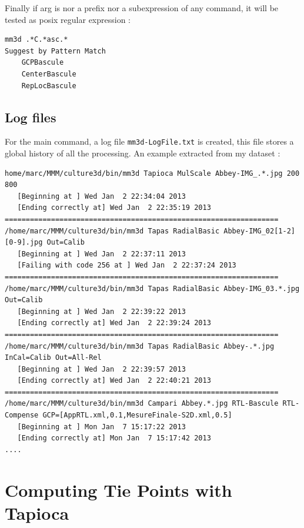 Finally if arg is nor a prefix nor a subexpression of any command, it will be tested as posix regular 
expression :

\begin{verbatim}
mm3d .*C.*asc.*
Suggest by Pattern Match
    GCPBascule
    CenterBascule
    RepLocBascule
\end{verbatim}

\subsection{Log files}

For the main command, a log file {\tt mm3d-LogFile.txt} is created, this file stores
a global history of all the processing. An example extracted from my dataset :

\begin{verbatim}
home/marc/MMM/culture3d/bin/mm3d Tapioca MulScale Abbey-IMG_.*.jpg 200 800
   [Beginning at ] Wed Jan  2 22:34:04 2013
   [Ending correctly at] Wed Jan  2 22:35:19 2013
=================================================================
/home/marc/MMM/culture3d/bin/mm3d Tapas RadialBasic Abbey-IMG_02[1-2][0-9].jpg Out=Calib
   [Beginning at ] Wed Jan  2 22:37:11 2013
   [Failing with code 256 at ] Wed Jan  2 22:37:24 2013
=================================================================
/home/marc/MMM/culture3d/bin/mm3d Tapas RadialBasic Abbey-IMG_03.*.jpg Out=Calib
   [Beginning at ] Wed Jan  2 22:39:22 2013
   [Ending correctly at] Wed Jan  2 22:39:24 2013
=================================================================
/home/marc/MMM/culture3d/bin/mm3d Tapas RadialBasic Abbey-.*.jpg InCal=Calib Out=All-Rel
   [Beginning at ] Wed Jan  2 22:39:57 2013
   [Ending correctly at] Wed Jan  2 22:40:21 2013
=================================================================
/home/marc/MMM/culture3d/bin/mm3d Campari Abbey.*.jpg RTL-Bascule RTL-Compense GCP=[AppRTL.xml,0.1,MesureFinale-S2D.xml,0.5]
   [Beginning at ] Mon Jan  7 15:17:22 2013
   [Ending correctly at] Mon Jan  7 15:17:42 2013
....
\end{verbatim}





\section{Computing Tie Points with Tapioca}

